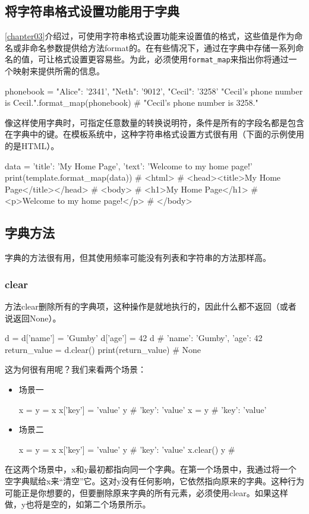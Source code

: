 \subsection{将字符串格式设置功能用于字典}
\autoref{chapter03}介绍过，可使用字符串格式设置功能来设置值的格式，这些值是作为命名或非命名参数提供给方法format的。在有些情况下，通过在字典中存储一系列命名的值，可让格式设置更容易些。为此，必须使用\verb|format_map|来指出你将通过一个映射来提供所需的信息。

\begin{pyc}
phonebook = {"Alice": '2341', "Neth": '9012', "Cecil": '3258'}
"Cecil's phone number is {Cecil}.".format_map(phonebook)
# "Cecil's phone number is 3258."
\end{pyc}
像这样使用字典时，可指定任意数量的转换说明符，条件是所有的字段名都是包含在字典中的键。在模板系统中，这种字符串格式设置方式很有用（下面的示例使用的是HTML）。
\begin{pyc}
data = {'title': 'My Home Page', 'text': 'Welcome to my home page!'}
print(template.format_map(data))
# <html>
# <head><title>My Home Page</title></head>
# <body>
# <h1>My Home Page</h1>
# <p>Welcome to my home page!</p>
# </body>
\end{pyc}
\subsection{字典方法}
字典的方法很有用，但其使用频率可能没有列表和字符串的方法那样高。
\subsubsection{clear}
方法clear删除所有的字典项，这种操作是就地执行的，因此什么都不返回（或者说返回None）。
\begin{pyc}
d = {}
d['name'] = 'Gumby'
d['age'] = 42
d  # {'name': 'Gumby', 'age': 42}
return_value = d.clear()
print(return_value)  # None
\end{pyc}

这为何很有用呢？我们来看两个场景：
\begin{itemize}
    \item 场景一
    \begin{pyc}
x = {}
y = x
x['key'] = 'value'
y  # {'key': 'value'}
x = {}
y  # {'key': 'value'}
    \end{pyc}
    \item 场景二
    \begin{pyc}
x = {}
y = x
x['key'] = 'value'
y  # {'key': 'value'}
x.clear()
y  # {}
    \end{pyc}
\end{itemize}
在这两个场景中，x和y最初都指向同一个字典。在第一个场景中，我通过将一个空字典赋给x来“清空”它。这对y没有任何影响，它依然指向原来的字典。这种行为可能正是你想要的，但要删除原来字典的所有元素，必须使用clear。如果这样做，y也将是空的，如第二个场景所示。

